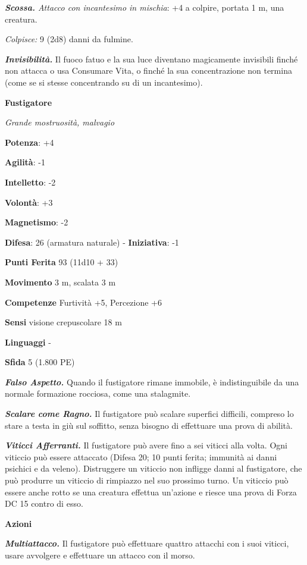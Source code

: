 \begin{multicols}{2}
\emph{\textbf{Scossa.} Attacco con incantesimo in mischia}: +4 a
colpire, portata 1 m, una creatura.

\emph{Colpisce:} 9 (2d8) danni da fulmine.

\emph{\textbf{Invisibilità.}} Il fuoco fatuo e la sua luce diventano
magicamente invisibili finché non attacca o usa Consumare Vita, o finché
la sua concentrazione non termina (come se si stesse concentrando su di
un incantesimo).

\textbf{Fustigatore}

\emph{Grande mostruosità, malvagio}

\textbf{Potenza}: +4

\textbf{Agilità}: -1

\textbf{Intelletto}: -2

\textbf{Volontà}: +3

\textbf{Magnetismo}: -2

\textbf{Difesa}: 26 (armatura naturale) - \textbf{Iniziativa}: -1

\textbf{Punti Ferita} 93 (11d10 + 33)

\textbf{Movimento} 3 m, scalata 3 m

\textbf{Competenze} Furtività +5, Percezione +6

\textbf{Sensi} visione crepuscolare 18 m

\textbf{Linguaggi} -

\textbf{Sfida} 5 (1.800 PE)\smallskip

\emph{\textbf{Falso Aspetto.}} Quando il fustigatore rimane immobile, è
indistinguibile da una normale formazione rocciosa, come una stalagmite.

\emph{\textbf{Scalare come Ragno.}} Il fustigatore può scalare superfici
difficili, compreso lo stare a testa in giù sul soffitto, senza bisogno
di effettuare una prova di abilità.

\emph{\textbf{Viticci Afferranti.}} Il fustigatore può avere fino a sei
viticci alla volta. Ogni viticcio può essere attaccato (Difesa 20; 10 punti
ferita; immunità ai danni psichici e da veleno). Distruggere un viticcio
non infligge danni al fustigatore, che può produrre un viticcio di
rimpiazzo nel suo prossimo turno. Un viticcio può essere anche rotto se
una creatura effettua un'azione e riesce una prova di Forza DC 15 contro
di esso.

\smallskip\textbf{Azioni}

\emph{\textbf{Multiattacco.}} Il fustigatore può effettuare quattro
attacchi con i suoi viticci, usare avvolgere e effettuare un attacco con
il morso.


\end{multicols}
